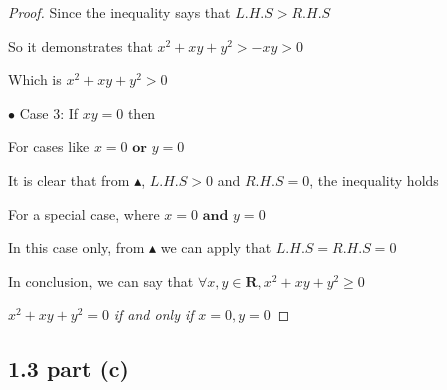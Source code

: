 \documentclass[12pt]{article}
\begin{document}
\begin{proof}
    \vspace*{0.3cm}
    \hspace*{2.9cm}
    Since the inequality says that $L.H.S > R.H.S$

    \vspace*{0.3cm}
    \hspace*{2.9cm}
    So it demonstrates that $x^2 + xy + y^2 > -xy > 0$

    \vspace*{0.3cm}
    \hspace*{2.9cm}
    Which is $x^2 + xy + y^2 > 0$


    \vspace*{0.5cm}
    \hspace*{2.5cm}
    $\bullet$ Case 3: If $xy = 0$ then

    \vspace*{0.3cm}
    \hspace*{2.9cm}
    For cases like $x=0$ $\mathbf{or}$ $y=0$

    \vspace*{0.3cm}
    \hspace*{2.9cm}
    It is clear that from $\blacktriangle$, $L.H.S >0$ and $R.H.S =0$, the inequality holds

    \vspace*{0.3cm}
    \hspace*{2.9cm}
    For a special case, where $x=0$ $\mathbf{and}$ $y=0$


    \vspace*{0.3cm}
    \hspace*{2.9cm}
    In this case only, from $\blacktriangle$ we can apply that $L.H.S = R.H.S = 0$


    \vspace*{0.5cm}
    \hspace*{1.2cm}
    In conclusion, we can say that $\forall x,y \in \mathbf{R}, x^2 + xy + y^2 \geq 0$

    \vspace*{0.5cm}
    \hspace*{1.2cm}
    $ x^2 + xy + y^2 = 0 $ \textit{if and only if} $x = 0, y = 0$


\end{proof}


\subsection*{1.3 part (c)}
\end{document}
